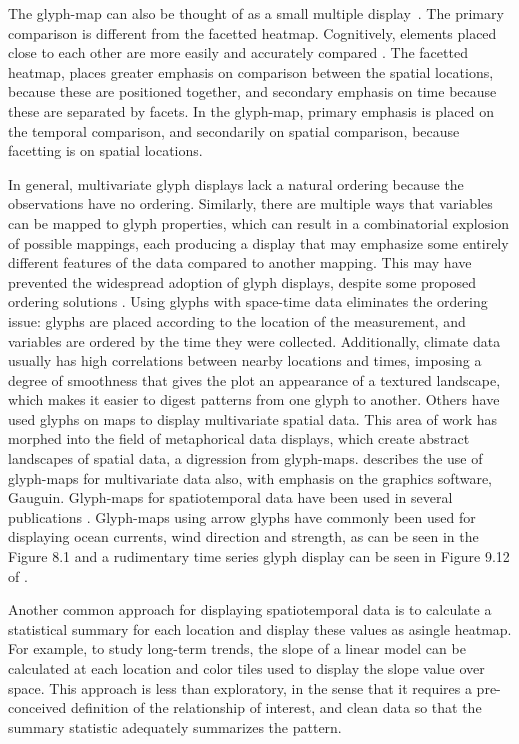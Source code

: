 \documentclass[oneside]{article}
\begin{document}
The glyph-map can also be thought of as a small multiple display~\citep{tufte:2001}. The primary comparison is different from the facetted heatmap. Cognitively, elements placed close to each other are more easily and accurately compared \citep{cleveland:1984}. The facetted heatmap, places greater emphasis on comparison between the spatial locations, because these are positioned together, and secondary emphasis on time because these are separated by facets. In the glyph-map, primary emphasis is placed on the temporal comparison, and secondarily on spatial comparison, because facetting is on spatial locations.  

In general, multivariate glyph displays lack a natural ordering because the observations have no ordering. Similarly, there are multiple ways that variables can be mapped to glyph properties, which can result in a combinatorial explosion of possible mappings, each producing a display that may emphasize some entirely different features of the data compared to another mapping. This may have prevented the widespread adoption of glyph displays, despite some proposed ordering solutions \citep{kleiner:1981,hurley:2010}. Using glyphs with space-time data eliminates the ordering issue: glyphs are placed according to the location of the measurement, and variables are ordered by the time they were collected. Additionally, climate data usually has high correlations between nearby locations and times, imposing a degree of smoothness that gives the plot an appearance of a textured  landscape, which makes it easier to digest patterns from one glyph to another. Others \citep{pickett:1988} have used glyphs on maps to display multivariate spatial data. This area of work has morphed into the field of metaphorical data displays, which create abstract landscapes of spatial data, a digression from glyph-maps. \citet{gribov:2006} describes the use of glyph-maps for multivariate data also, with emphasis on the graphics software, Gauguin. Glyph-maps for spatiotemporal data have been used in several publications \citep{carr:1992,eden:2010,hobbs:2010}. Glyph-maps using arrow glyphs have commonly been used for displaying ocean currents, wind direction and strength, as can be seen in the Figure 8.1  and a rudimentary time series glyph display can be seen in Figure 9.12 of \citet{IPCC}. 

Another common approach for displaying spatiotemporal data is to calculate a statistical summary for each location and display these values as asingle heatmap. For example, to study long-term trends, the slope of a linear model can be calculated at each location and color tiles used to display the slope value over space. This approach is less than exploratory, in the sense that it requires a pre-conceived definition of the relationship of interest, and clean data so that the summary statistic adequately summarizes the pattern. 
\end{document}
